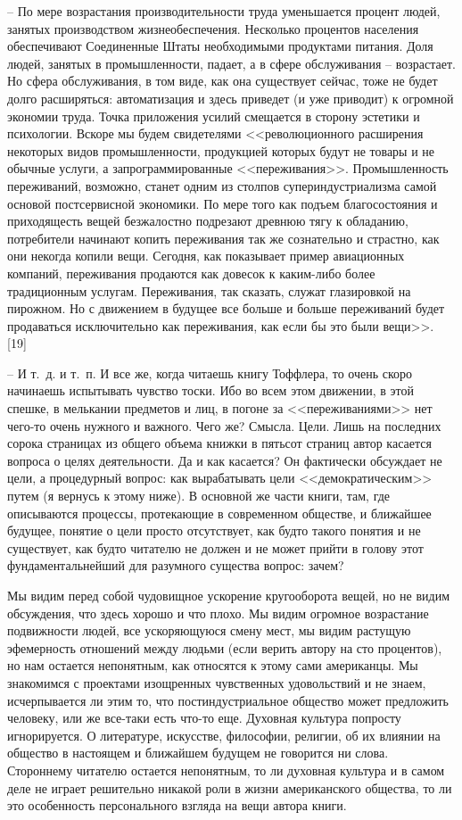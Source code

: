 \documentclass{book}
\begin{document}
-- По мере возрастания производительности труда уменьша­ется процент людей, занятых производством жизнеобеспечения. Несколько процентов населения обеспечивают Соединен­ные Штаты необходимыми продуктами питания. Доля людей, занятых в промышленности, падает, а в сфере обслуживания -- возрастает. Но сфера обслуживания, в том виде, как она су­ществует сейчас, тоже не будет долго расширяться: автомати­зация и здесь приведет (и уже приводит) к огромной экономии труда. Точка приложения усилий смещается в сторону эстетики и психологии. Вскоре мы будем свидетелями <<революционного расширения некоторых видов промышленности, продукцией которых будут не товары и не обычные услуги, а запрограммированные <<переживания>>. Промышленность переживаний, возможно, станет одним из столпов супериндустриализма самой основой постсервисной экономики. По мере того как подъем благосостояния и приходящесть вещей безжалостно подрезают древнюю тягу к обладанию, потребители начинают копить переживания так же сознательно и страстно, как 
они 
некогда копили вещи. Сегодня, как показывает пример авиаци­онных компаний, переживания продаются как довесок к каким-либо более традиционным услугам. Переживания, так сказать, служат глазировкой на пирожном. Но с движением в будущее все больше и больше переживаний будет продаваться исклю­чительно как переживания, как если бы это были вещи>>. [19]

-- И т.~д. и т.~п.
И все же, когда читаешь книгу Тоффлера, то очень скоро начинаешь испытывать чувство тоски. Ибо во всем этом движе­нии, в этой спешке, в мелькании предметов и лиц, в погоне за <<переживаниями>> нет чего-то очень нужного и важного. Чего же? Смысла. Цели.
Лишь на последних сорока страницах из общего объема книжки в пятьсот страниц автор касается вопроса о целях деятельности. Да и как касается? Он фактически обсуждает не цели, а  процедурный вопрос: как вырабатывать цели <<демократическим>> путем (я вернусь к этому ниже). В основной же части книги, там, где описываются процессы, протекающие в совре­менном обществе, и ближайшее будущее, понятие о цели просто отсутствует, как будто такого понятия и не существует, как будто читателю не должен и не может прийти в голову этот фундаментальнейший для разумного существа вопрос: зачем?

Мы видим перед собой чудовищное ускорение кругооборо­та вещей, но не видим обсуждения, что здесь хорошо и что пло­хо. Мы видим огромное возрастание подвижности людей, все ускоряющуюся смену мест, мы видим растущую эфемерность отношений между людьми (если верить автору на сто процен­тов), но нам остается непонятным, как относятся к этому са­ми американцы. Мы знакомимся с проектами изощренных чувственных удовольствий и не знаем, исчерпывается ли этим то, что постиндустриальное общество может предложить чело­веку, или же все-таки есть что-то еще. Духовная культура по­просту игнорируется. О литературе, искусстве, философии, ре­лигии, об их влиянии на общество в настоящем и ближайшем бу­дущем не говорится ни слова. Стороннему читателю остается не­понятным, то ли духовная культура и в самом деле не играет решительно никакой роли в жизни американского общества, то ли это особенность персонального взгляда на вещи автора книги.
\end{document}
